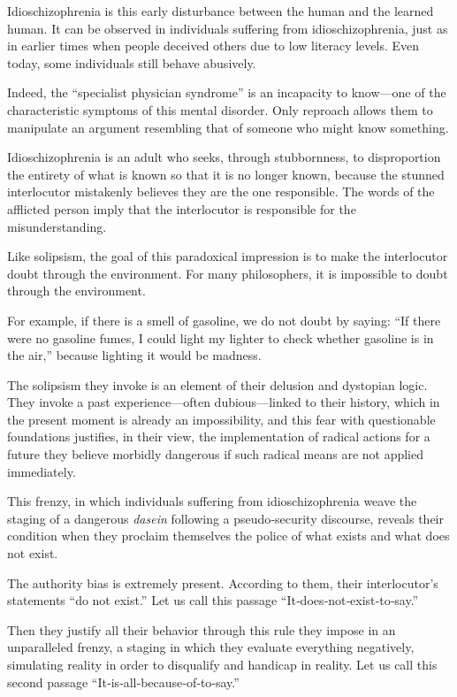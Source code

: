 \documentclass[12pt,oneside]{article}
\begin{document}
Idioschizophrenia is this early disturbance between the human and the learned human. It can be observed in individuals suffering from idioschizophrenia, just as in earlier times when people deceived others due to low literacy levels. Even today, some individuals still behave abusively.

Indeed, the “specialist physician syndrome” is an incapacity to know—one of the characteristic symptoms of this mental disorder. Only reproach allows them to manipulate an argument resembling that of someone who might know something.

Idioschizophrenia is an adult who seeks, through stubbornness, to disproportion the entirety of what is known so that it is no longer known, because the stunned interlocutor mistakenly believes they are the one responsible. The words of the afflicted person imply that the interlocutor is responsible for the misunderstanding.

Like solipsism, the goal of this paradoxical impression is to make the interlocutor doubt through the environment. For many philosophers, it is impossible to doubt through the environment.

For example, if there is a smell of gasoline, we do not doubt by saying: “If there were no gasoline fumes, I could light my lighter to check whether gasoline is in the air,” because lighting it would be madness.

The solipsism they invoke is an element of their delusion and dystopian logic. They invoke a past experience—often dubious—linked to their history, which in the present moment is already an impossibility, and this fear with questionable foundations justifies, in their view, the implementation of radical actions for a future they believe morbidly dangerous if such radical means are not applied immediately.

This frenzy, in which individuals suffering from idioschizophrenia weave the staging of a dangerous \emph{dasein} following a pseudo‑security discourse, reveals their condition when they proclaim themselves the police of what exists and what does not exist.

The authority bias is extremely present. According to them, their interlocutor’s statements “do not exist.” Let us call this passage “It‑does‑not‑exist‑to‑say.”

Then they justify all their behavior through this rule they impose in an unparalleled frenzy, a staging in which they evaluate everything negatively, simulating reality in order to disqualify and handicap in reality. Let us call this second passage “It‑is‑all‑because‑of‑to‑say.”
\end{document}
